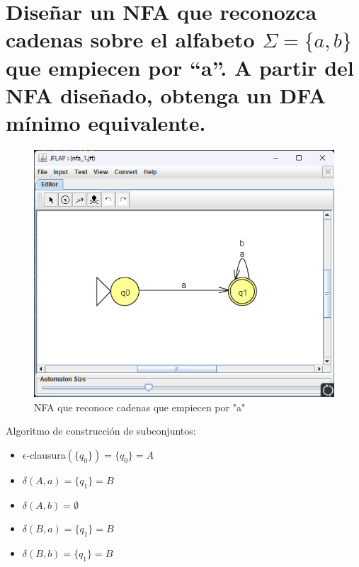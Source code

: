 \documentclass[11pt]{report}
\begin{document}
\section{Diseñar un NFA que reconozca cadenas sobre el alfabeto $\Sigma = \{a, b\}$ que empiecen por “a”. A partir del NFA diseñado, obtenga un DFA mínimo equivalente.}
\begin{figure}[H]
  \centering
  \includegraphics[scale=0.6]{img/NFA_01.png}
  \caption{NFA que reconoce cadenas que empiecen por "a"}
\end{figure}

Algoritmo de construcción de subconjuntos:
\begin{itemize}
  \item $\epsilon$-clausura$(\{q_0\}) = \{q_0\} = A$
  \item $\delta(A, a) = \{q_1\} = B$ 
  \item $\delta(A, b) = \emptyset$
  \item $\delta(B, a) = \{q_1\} = B$
  \item $\delta(B, b) = \{q_1\} = B$
\end{itemize}

\newpage
\end{document}
